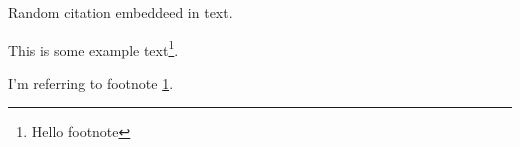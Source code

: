 \documentclass{article}
\begin{document}
Random citation \autocite[1]{DUMMY:1} embeddeed in text.

\newpage

This is some example text\footnote{\label{myfootnote}Hello footnote}.

I'm referring to footnote \ref{myfootnote}.


\printbibliography
\end{document}
